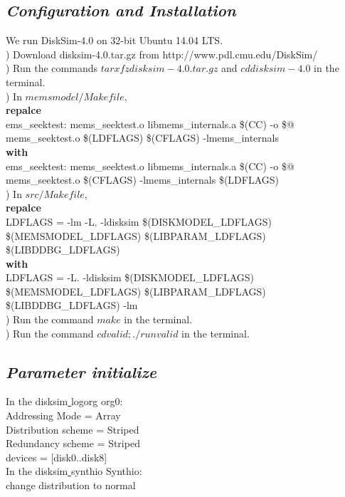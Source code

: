 \documentclass[conference]{IEEEtran}
\begin{document}
\subsection{\emph{\textbf{Configuration and Installation}}}
\begin{flushleft}
\quad We run DiskSim-4.0 on 32-bit Ubuntu 14.04 LTS.\\
) Download disksim-4.0.tar.gz from http://www.pdl.cmu.edu/DiskSim/ \\
) Run the commands $ tar xfz disksim-4.0.tar.gz $ and $cd disksim-4.0$ in the terminal.\\
) In $memsmodel/Makefile$, \\
\quad \textbf{repalce}\\
\quad \quad ems\_seektest: mems\_seektest.o libmems\_internals.a \$(CC) -o \$@ mems\_seektest.o \$(LDFLAGS) \$(CFLAGS) -lmems\_internals \\
\quad \textbf{with}\\
\quad \quad ems\_seektest: mems\_seektest.o libmems\_internals.a \$(CC) -o \$@ mems\_seektest.o \$(CFLAGS) -lmems\_internals \$(LDFLAGS) \\
) In $src/Makefile$, \\
\quad \textbf{repalce}\\
\quad \quad LDFLAGS = -lm -L. -ldisksim \$(DISKMODEL\_LDFLAGS) \$(MEMSMODEL\_LDFLAGS) \$(LIBPARAM\_LDFLAGS) \$(LIBDDBG\_LDFLAGS) \\
\quad \textbf{with}\\
\quad \quad LDFLAGS = -L. -ldisksim \$(DISKMODEL\_LDFLAGS) \$(MEMSMODEL\_LDFLAGS) \$(LIBPARAM\_LDFLAGS) \$(LIBDDBG\_LDFLAGS) -lm \\
) Run the command $make$ in the terminal. \\
) Run the command $cd valid; ./runvalid$ in the terminal. \\
\end{flushleft}
\subsection{\emph{\textbf{Parameter initialize}}}
\begin{flushleft}
    In the disksim\underline{ }logorg org0:\\
    \quad Addressing Mode = Array\\
    \quad Distribution scheme = Striped\\
    \quad Redundancy scheme = Striped\\
    \quad devices = [disk0..disk8]\\
    In the disksim\underline{ }synthio Synthio:\\
    change distribution to normal
\end{flushleft}
\end{document}
